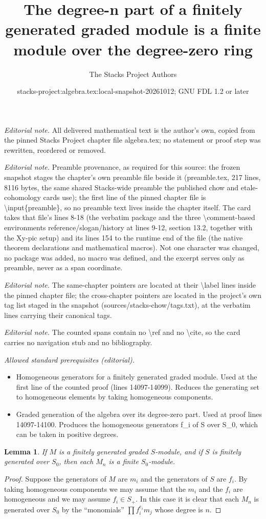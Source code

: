 \documentclass[10pt,a4paper]{amsart}
\title{The degree-n part of a finitely generated graded module is a finite module over the degree-zero ring}
\author{The Stacks Project Authors}
\date{stacks-project:algebra.tex:local-snapshot-20261012; GNU FDL 1.2 or later}
\theoremstyle{plain}
\newtheorem{lemma}[subsection]{Lemma}
\theoremstyle{definition}
\theoremstyle{remark}
\numberwithin{equation}{subsection}
\begin{document}
\maketitle
\noindent\textit{Editorial note.} All delivered mathematical text is the author's own, copied from the pinned Stacks Project chapter file algebra.tex; no statement or proof step was rewritten, reordered or removed.\par\medskip
\noindent\textit{Editorial note.} Preamble provenance, as required for this source: the frozen snapshot stages the chapter's own preamble file beside it (preamble.tex, 217 lines, 8116 bytes, the same shared Stacks-wide preamble the published chow and etale-cohomology cards use); the first line of the pinned chapter file is \textbackslash{}input\{preamble\}, so no preamble text lives inside the chapter itself. The card takes that file's lines 8-18 (the verbatim package and the three \textbackslash{}comment-based environments reference/slogan/history at lines 9-12, section 13.2, together with the Xy-pic setup) and its lines 154 to the runtime end of the file (the native theorem declarations and mathematical macros). Not one character was changed, no package was added, no macro was defined, and the excerpt serves only as preamble, never as a span coordinate.\par\medskip
\noindent\textit{Editorial note.} The same-chapter pointers are located at their \textbackslash{}label lines inside the pinned chapter file; the cross-chapter pointers are located in the project's own tag list staged in the snapshot (sources/stacks-chow/tags.txt), at the verbatim lines carrying their canonical tags.\par\medskip
\noindent\textit{Editorial note.} The counted spans contain no \textbackslash{}ref and no \textbackslash{}cite, so the card carries no navigation stub and no bibliography.\par\medskip
\noindent\textit{Allowed standard prerequisites (editorial).}\begin{itemize}
\item Homogeneous generators for a finitely generated graded module. Used at the first line of the counted proof (lines 14097-14099). Reduces the generating set to homogeneous elements by taking homogeneous components.
\item Graded generation of the algebra over its degree-zero part. Used at proof lines 14097-14100. Produces the homogeneous generators f\_i of S over S\_0, which can be taken in positive degrees.
\end{itemize}\medskip
\begin{lemma}
\label{lemma-graded-module-fg}
If $M$ is a finitely generated graded $S$-module,
and if $S$ is finitely generated over $S_0$, then
each $M_n$ is a finite $S_0$-module.
\end{lemma}

\begin{proof}
Suppose the generators of $M$ are $m_i$ and the generators
of $S$ are $f_i$. By taking homogeneous components we may
assume that the $m_i$ and the $f_i$ are homogeneous
and we may assume $f_i \in S_{+}$. In this case it is
clear that each $M_n$ is generated over $S_0$
by the ``monomials'' $\prod f_i^{e_i} m_j$ whose
degree is $n$.
\end{proof}
\end{document}
